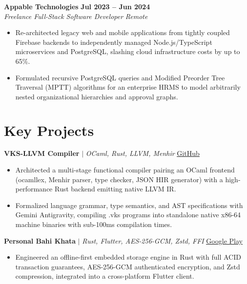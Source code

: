 \documentclass[10pt,a4paper]{article}
\begin{document}
\vspace{2pt}
\textbf{Appable Technologies} \hfill \textbf{Jul 2023 – Jun 2024} \\
\textit{Freelance Full-Stack Software Developer} \hfill \textit{Remote}
\begin{itemize}
  \item Re-architected legacy web and mobile applications from tightly coupled Firebase backends to independently managed Node.js/TypeScript microservices and PostgreSQL, slashing cloud infrastructure costs by up to 65\%.
  \item Formulated recursive PostgreSQL queries and Modified Preorder Tree Traversal (MPTT) algorithms for an enterprise HRMS to model arbitrarily nested organizational hierarchies and approval graphs.
\end{itemize}

\section*{Key Projects}

\textbf{VKS-LLVM Compiler} $\vert$ \textit{OCaml, Rust, LLVM, Menhir} \hfill \href{https://github.com/vinayakgupta29/llvm-compiler}{\underline{GitHub}}
\begin{itemize}
  \item Architected a multi-stage functional compiler pairing an OCaml frontend (ocamllex, Menhir parser, type checker, JSON HIR generator) with a high-performance Rust backend emitting native LLVM IR.
  \item Formalized language grammar, type semantics, and AST specifications with Gemini Antigravity, compiling .vks programs into standalone native x86-64 machine binaries with sub-100ms compilation times.
\end{itemize}

\vspace{2pt}
\textbf{Personal Bahi Khata} $\vert$ \textit{Rust, Flutter, AES-256-GCM, Zstd, FFI} \hfill \href{https://play.google.com/store/apps/details?id=com.vins.bahi_khata}{\underline{Google Play}}
\begin{itemize}
  \item Engineered an offline-first embedded storage engine in Rust with full ACID transaction guarantees, AES-256-GCM authenticated encryption, and Zstd compression, integrated into a cross-platform Flutter client.
\end{itemize}
\end{document}
